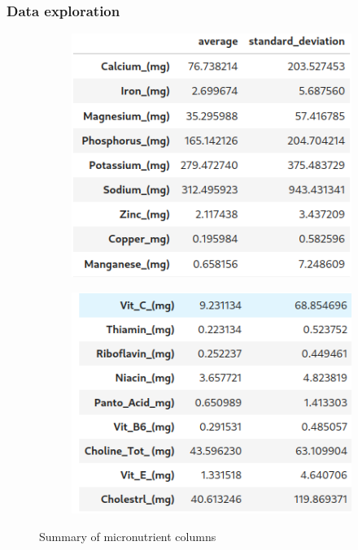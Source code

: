 \documentclass{beamer}
\begin{document}
\begin{frame}
	\frametitle{Data exploration}
	\begin{figure}[H]
		\centering
		\begin{subfigure}[b]{0.45\linewidth}
			\includegraphics[width=\linewidth]{img/eda_std1.png}
		\end{subfigure}
		\begin{subfigure}[b]{0.45\linewidth}
			\includegraphics[width=\linewidth]{img/eda_std2.png}
		\end{subfigure}
		\caption{Summary of micronutrient columns}
	\end{figure}
\end{frame}
\end{document}
